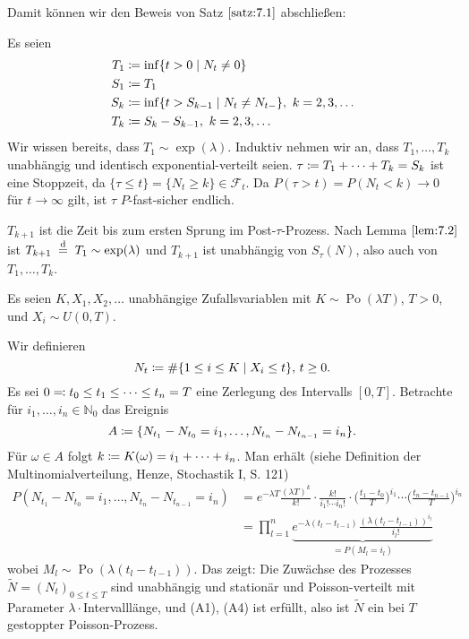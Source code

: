 \documentclass[a4paper,twoside,DIV15,BCOR12mm]{scrbook}
\newcommand{\cF}{\mathcal F}
\begin{document}
Damit können wir den Beweis von Satz $\ref{satz:7.1}$ abschließen:

Es seien
\begin{align*}
T_1 &\da \inf\{t>0\mid N_t\ne 0\} \\
S_1 &\da T_1 \\
S_k &\da \inf\{t>S_{k-1} \mid N_t \ne N_{t-}\},\ k=2,3,\ldots\\
T_k &\da S_k - S_{k-1},\ k=2,3,\dots
\end{align*}
Wir wissen bereits, dass $T_1 \sim \exp(\lambda)$. Induktiv nehmen wir an, dass $T_1,\ldots,T_k$ unabhängig und identisch exponential-verteilt seien. $\tau \da T_1 + \cdots + T_k = S_k$ ist eine Stoppzeit, da $\{\tau \le t\} = \{N_t \ge k\} \in \cF_t$. Da $P(\tau > t)= P(N_t < k) \to 0$ für $t\to\infty$ gilt, ist $\tau$ $P$-fast-sicher endlich.

$T_{k+1}$ ist die Zeit bis zum ersten Sprung im Post-$\tau$-Prozess. Nach Lemma $\ref{lem:7.2}$ ist $T_{k+1}\gleichnach{d} T_1\sim \exp(\lambda)$ und $T_{k+1}$ ist unabhängig von $S_\tau(N)$, also auch von $T_1,\ldots,T_k$.

\begin{beispiel}
Es seien $K,X_1,X_2,\ldots$ unabhängige Zufallsvariablen mit $K\sim \operatorname{Po}(\lambda T)$, $T>0$, und $X_i\sim U(0,T)$.

Wir definieren\[
N_t \da \#\{1\le i \le K\mid X_i\le t\},\, t\ge 0.
\]
Es sei $0\ad t_0\le t_1 \le \cdots\le t_n=T$ eine Zerlegung des Intervalls $[0,T]$. Betrachte für $i_1,\ldots,i_n\in \mathbb N_0$ das Ereignis
\[
A \da \{N_{t_1} - N_{t_0} = i_1,\ldots,N_{t_n}-N_{t_{n-1}} = i_n\}.
\]
Für $\omega \in A$ folgt $k \da K(\omega) = i_1+\cdots+ i_n$. Man erhält (siehe Definition der Multinomialverteilung, Henze, Stochastik I, S. 121)
\begin{align*}
P(N_{t_1} - N_{t_0}=i_1,\ldots,N_{t_n} - N_{t_{n-1}} = i_n) 
&= e^{-\lambda T}\frac{(\lambda T)^k}{k!}\cdot \frac{k!}{i_1!\cdots i_n!}\cdot\Big(\frac{t_1-t_0}{T}\Big)^{i_1}\cdots \Big(\frac{t_n-t_{n-1}}{T}\Big)^{i_n} \\
&= \prod_{l=1}^n \underbrace{e^{-\lambda(t_l-t_{l-1})} \frac{(\lambda (t_l - t_{l-1}))^{i_l}}{i_l!}}_{=P(M_l=i_l)}
\end{align*}
wobei $M_l\sim \operatorname{Po}(\lambda(t_l-t_{l-1}))$. Das zeigt: Die Zuwächse des Prozesses $\tilde N=(N_t)_{0\le t\le T}$ sind unabhängig und stationär und Poisson-verteilt mit Parameter $\lambda\cdot$Intervalllänge, und (A1), (A4) ist erfüllt, also ist $\tilde N$ ein bei $T$ gestoppter Poisson-Prozess.
\end{beispiel}
\end{document}
